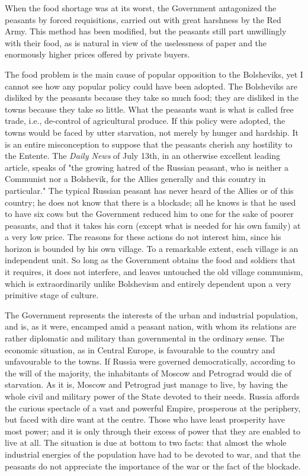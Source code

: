 When the food shortage was at its worst, the Government antagonized the peasants by forced requisitions, carried out with great harshness by the Red Army. This method has been modified, but the peasants still part unwillingly with their food, as is natural in view of the uselessness of paper and the enormously higher prices offered by private buyers.

The food problem is the main cause of popular opposition to the Bolsheviks, yet I cannot see how any popular policy could have been adopted. The Bolsheviks are disliked by the peasants because they take so much food; they are disliked in the towns because they take so little. What the peasants want is what is called free trade, i.e., de-control of agricultural produce. If this policy were adopted, the towns would be faced by utter starvation, not merely by hunger and hardship. It is an entire misconception to suppose that the peasants cherish any hostility to the Entente. The \emph{Daily News} of July 13th, in an otherwise excellent leading article, speaks of "the growing hatred of the Russian peasant, who is neither a Communist nor a Bolshevik, for the Allies generally and this country in particular." The typical Russian peasant has never heard of the Allies or of this country; he does not know that there is a blockade; all he knows is that he used to have six cows but the Government reduced him to one for the sake of poorer peasants, and that it takes his corn (except what is needed for his own family) at a very low price. The reasons for these actions do not interest him, since his horizon is bounded by his own village. To a remarkable extent, each village is an independent unit. So long as the Government obtains the food and soldiers that it requires, it does not interfere, and leaves untouched the old village communism, which is extraordinarily unlike Bolshevism and entirely dependent upon a very primitive stage of culture.

The Government represents the interests of the urban and industrial population, and is, as it were, encamped amid a peasant nation, with whom its relations are rather diplomatic and military than governmental in the ordinary sense. The economic situation, as in Central Europe, is favourable to the country and unfavourable to the towns. If Russia were governed democratically, according to the will of the majority, the inhabitants of Moscow and Petrograd would die of starvation. As it is, Moscow and Petrograd just manage to live, by having the whole civil and military power of the State devoted to their needs. Russia affords the curious spectacle of a vast and powerful Empire, prosperous at the periphery, but faced with dire want at the centre. Those who have least prosperity have most power; and it is only through their excess of power that they are enabled to live at all. The situation is due at bottom to two facts: that almost the whole industrial energies of the population have had to be devoted to war, and that the peasants do not appreciate the importance of the war or the fact of the blockade.

